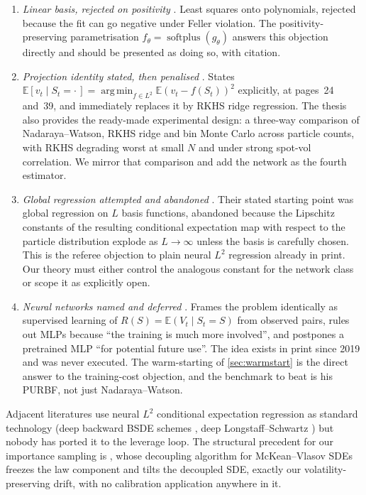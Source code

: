 \documentclass[11pt,a4paper]{article}
\theoremstyle{plain}
\theoremstyle{definition}
\theoremstyle{definition}
\newcommand{\E}{\mathbb{E}}
\begin{document}
\begin{enumerate}
\item \emph{Linear basis, rejected on positivity} \citep[Remark~3.2]{vanderstoep2014}. Least squares onto polynomials, rejected because the fit can go negative under Feller violation. The positivity-preserving parametrisation $f_\theta = \operatorname{softplus}(g_\theta)$ answers this objection directly and should be presented as doing so, with citation.
\item \emph{Projection identity stated, then penalised} \citep{li2023thesis}. States $\E[v_t \mid S_t = \cdot\,] = \operatorname*{arg\,min}_{f \in L^2} \E(v_t - f(S_t))^2$ explicitly, at pages~24 and~39, and immediately replaces it by RKHS ridge regression. The thesis also provides the ready-made experimental design: a three-way comparison of Nadaraya--Watson, RKHS ridge and bin Monte Carlo across particle counts, with RKHS degrading worst at small $N$ and under strong spot-vol correlation. We mirror that comparison and add the network as the fourth estimator.
\item \emph{Global regression attempted and abandoned} \citep[p.~5]{bayer2022rkhs}. Their stated starting point was global regression on $L$ basis functions, abandoned because the Lipschitz constants of the resulting conditional expectation map with respect to the particle distribution explode as $L \to \infty$ unless the basis is carefully chosen. This is the referee objection to plain neural $L^2$ regression already in print. Our theory must either control the analogous constant for the network class or scope it as explicitly open.
\item \emph{Neural networks named and deferred} \citep{hakala2019}. Frames the problem identically as supervised learning of $R(S) = \E(V_t \mid S_t = S)$ from observed pairs, rules out MLPs because ``the training is much more involved'', and postpones a pretrained MLP ``for potential future use''. The idea exists in print since 2019 and was never executed. The warm-starting of \cref{sec:warmstart} is the direct answer to the training-cost objection, and the benchmark to beat is his PURBF, not just Nadaraya--Watson.
\end{enumerate}

Adjacent literatures use neural $L^2$ conditional expectation regression as standard technology (deep backward BSDE schemes \citep{hure2020}, deep Longstaff--Schwartz \citep{longstaff2001}) but nobody has ported it to the leverage loop. The structural precedent for our importance sampling is \citet{dosreis2023}, whose decoupling algorithm for McKean--Vlasov SDEs freezes the law component and tilts the decoupled SDE, exactly our volatility-preserving drift, with no calibration application anywhere in it.
\end{document}
